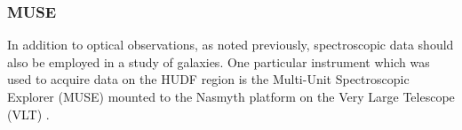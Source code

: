 \documentclass[12pt, twocolumn]{revtex4}    %
\begin{document}


\subsubsection{MUSE}

In addition to optical observations, as noted previously, spectroscopic data should also be employed in a study of galaxies. One particular instrument which was used to acquire data on the HUDF region is the Multi-Unit Spectroscopic Explorer (MUSE) mounted to the Nasmyth platform on the Very Large Telescope (VLT) \citep{bacon_muse_proposal}. 

\end{document}
